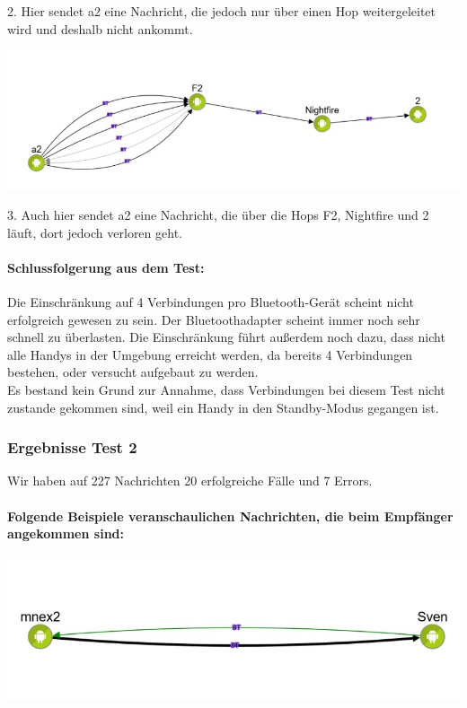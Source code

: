 2. Hier sendet a2 eine Nachricht, die jedoch nur über einen Hop
weitergeleitet wird und deshalb nicht ankommt.

\includegraphics[width=1.0\textwidth]{belege/grosstests/Bilder/Grosstest2/Test1Misserfolg3.jpg}

3. Auch hier sendet a2 eine Nachricht, die über die Hops F2, Nightfire und
2 läuft, dort jedoch verloren geht.

\paragraph{Schlussfolgerung aus dem Test:}

Die Einschränkung auf 4 Verbindungen pro Bluetooth-Gerät scheint nicht
erfolgreich gewesen zu sein. Der Bluetoothadapter scheint immer noch
sehr schnell zu überlasten. Die Einschränkung führt außerdem noch dazu,
dass nicht alle Handys in der Umgebung erreicht werden, da bereits 4
Verbindungen bestehen, oder versucht aufgebaut zu werden.\\

Es bestand kein Grund zur Annahme, dass Verbindungen bei diesem Test
nicht zustande gekommen sind, weil ein Handy in den Standby-Modus
gegangen ist.


\subsubsection{Ergebnisse Test 2}

Wir haben auf 227 Nachrichten 20 erfolgreiche Fälle und 7 Errors.

\paragraph{Folgende Beispiele veranschaulichen Nachrichten, die beim Empfänger angekommen sind:}

\includegraphics[width=1.0\textwidth]{belege/grosstests/Bilder/Grosstest2/Test2Erfolg1.jpg}

